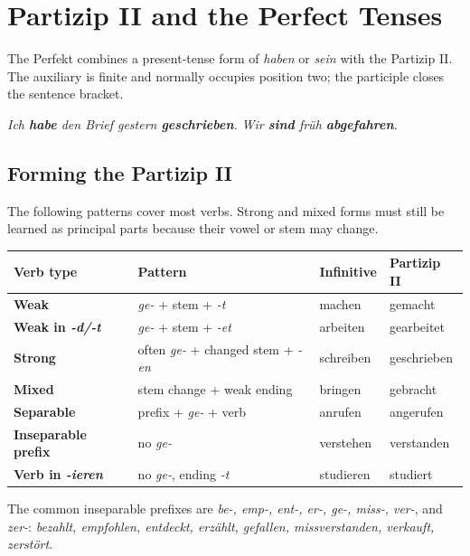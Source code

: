 \chapter{Partizip II and the Perfect Tenses}

The Perfekt combines a present-tense form of \textit{haben} or \textit{sein}
with the Partizip II\@. The auxiliary is finite and normally occupies position
two; the participle closes the sentence bracket.

\begin{center}
\textit{Ich \textbf{habe} den Brief gestern \textbf{geschrieben}.}
\qquad
\textit{Wir \textbf{sind} früh \textbf{abgefahren}.}
\end{center}

\section{Forming the Partizip II}

The following patterns cover most verbs. Strong and mixed forms must still be
learned as principal parts because their vowel or stem may change.

\begin{center}
\small
{}
\begin{tabularx}{\textwidth}{@{}>{\bfseries}l l l X@{}}
\toprule
Verb type & Pattern & Infinitive & Partizip II \\
\midrule
Weak & \textit{ge-} + stem + \textit{-t} & machen & gemacht \\
Weak in \textit{-d/-t} & \textit{ge-} + stem + \textit{-et} & arbeiten & gearbeitet \\
Strong & often \textit{ge-} + changed stem + \textit{-en} & schreiben & geschrieben \\
Mixed & stem change + weak ending & bringen & gebracht \\
Separable & prefix + \textit{ge-} + verb & anrufen & angerufen \\
Inseparable prefix & no \textit{ge-} & verstehen & verstanden \\
Verb in \textit{-ieren} & no \textit{ge-}, ending \textit{-t} & studieren & studiert \\
\bottomrule
\end{tabularx}
\end{center}

The common inseparable prefixes are \textit{be-, emp-, ent-, er-, ge-, miss-,
ver-}, and \textit{zer-}: \textit{bezahlt, empfohlen, entdeckt, erzählt,
gefallen, missverstanden, verkauft, zerstört}.

